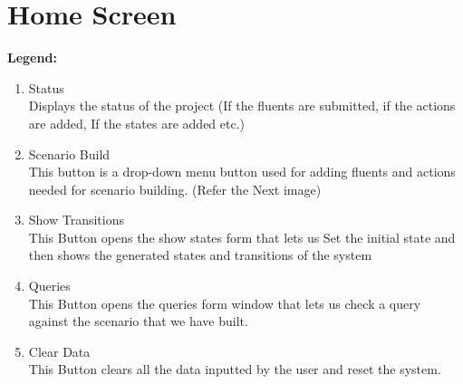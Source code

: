 \documentclass[11pt]{article}
\begin{document}
	\section{Home Screen}\label{sec:homescreen}
	\bfseries{Legend:}
\begin{enumerate}
	\item Status \\ Displays the status of the project (If the fluents are submitted, if the actions are 	added, If the states are added etc.)\\
 	\item Scenario Build \\  This button is a drop-down menu button used for adding fluents and actions needed 	for scenario building. (Refer the Next image)\\
	\item Show Transitions\\ This Button opens the show states form that lets us Set the initial state and then shows the generated states and transitions of the system\\
	\item Queries\\ This Button opens the queries form window that lets us check a query against the 	scenario that we have built.
	\item	Clear Data\\ This Button clears all the data inputted by the user and reset the system.
\end{enumerate}



		 
\end{document}
